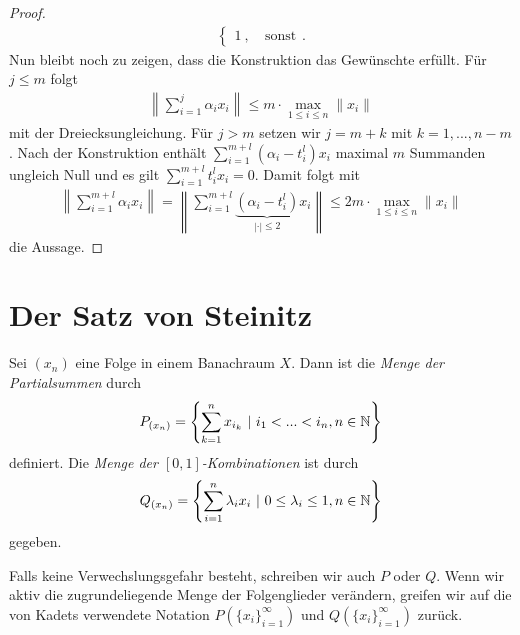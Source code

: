 \begin{proof}
\begin{align*}
\begin{cases}
			1 \ , &\ \text{sonst}
		\end{cases}.
	\end{align*}
	Nun bleibt noch zu zeigen, dass die Konstruktion das Gewünschte erfüllt.
	Für $ j \leq m $ folgt
	\begin{align*}
		\left\|
		\sum \limits_{i = 1 }^j \alpha_i x_i 
		\right\|
		\leq
		m \cdot \max \limits_{1 \leq i \leq n } \| x_i \|
	\end{align*} 
	mit der Dreiecksungleichung. Für $ j > m $ setzen wir $ j = m + k $ mit $ k = 1,...,n-m $.
	Nach der Konstruktion enthält $ \sum_{i=1}^{m+l} (\alpha_i - t_i^l) x_i $ maximal $ m $ Summanden ungleich Null und es gilt $ \sum_{i=1}^{m+l} t_i^l x_i =0 $.
	Damit folgt mit 
	\begin{align*}
		\left\|
		\sum \limits_{i = 1 }^{m+l} \alpha_i x_i 
		\right\|
		=
		\left\|
		\sum \limits_{i = 1 }^{m+l} \underbrace{(\alpha_i - t_i^l)}_{| \cdot | \leq 2} x_i 
		\right\|
		\leq 2 m \cdot \max \limits_{1 \leq i \leq n } \| x_i \|
	\end{align*}
	die Aussage.
\end{proof}

\section{Der Satz von Steinitz}
\begin{df}
	Sei $ (x_n) $ eine Folge in einem Banachraum  $ X $. 
	Dann ist die \textit{Menge der Partialsummen} durch
	\begin{align*}
		P_{(x_n)} = 
		\left\{ 
		\sum \limits_{k=1}^n x_{i_k} \  |  \ i_1 < ... < i_n, n \in \mathbb{N}
		\right\}
	\end{align*}
	definiert. Die \textit{Menge der $ [0,1] $-Kombinationen} ist durch
	\begin{align*}
		Q_{(x_n)}
		=
		\left\{ 
		\sum \limits_{i=1}^n \lambda_i x_i \ | \
		0 \leq \lambda_i \leq 1 , n \in \mathbb{N}
		\right\}
	\end{align*}
	gegeben. 
\end{df}

Falls keine Verwechslungsgefahr besteht, schreiben wir auch $ P $ oder $ Q $.
Wenn wir aktiv die zugrundeliegende Menge der Folgenglieder verändern, greifen wir auf die von Kadets\cite{Kadets1997} verwendete Notation $ P(\{x_i\}_{i = 1}^\infty) $ und $ Q(\{x_i\}_{i = 1}^\infty) $
zurück.

